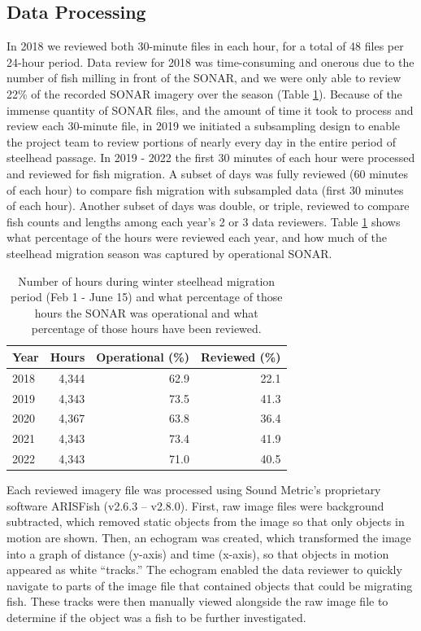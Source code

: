 \documentclass[
]{article}
\begin{document}
\FloatBarrier

\hypertarget{data-processing}{%
\subsection{Data Processing}\label{data-processing}}

In 2018 we reviewed both 30-minute files in each hour, for a total of 48 files per 24-hour period. Data review for 2018 was time-consuming and onerous due to the number of fish milling in front of the SONAR, and we were only able to review 22\% of the recorded SONAR imagery over the season (Table \ref{tab:op-rev}). Because of the immense quantity of SONAR files, and the amount of time it took to process and review each 30-minute file, in 2019 we initiated a subsampling design to enable the project team to review portions of nearly every day in the entire period of steelhead passage. In 2019 - 2022 the first 30 minutes of each hour were processed and reviewed for fish migration. A subset of days was fully reviewed (60 minutes of each hour) to compare fish migration with subsampled data (first 30 minutes of each hour). Another subset of days was double, or triple, reviewed to compare fish counts and lengths among each year's 2 or 3 data reviewers. Table \ref{tab:op-rev} shows what percentage of the hours were reviewed each year, and how much of the steelhead migration season was captured by operational SONAR.

\begin{table}[H]

\caption{\label{tab:op-rev}Number of hours during winter steelhead migration period (Feb 1 - June 15) and what percentage of those hours the SONAR was operational and what percentage of those hours have been reviewed.}
\centering
\begin{tabular}[t]{lrrr}
\toprule
Year & Hours & Operational (\%) & Reviewed (\%)\\
\midrule
2018 & 4,344 & 62.9 & 22.1\\
2019 & 4,343 & 73.5 & 41.3\\
2020 & 4,367 & 63.8 & 36.4\\
2021 & 4,343 & 73.4 & 41.9\\
2022 & 4,343 & 71.0 & 40.5\\
\bottomrule
\end{tabular}
\end{table}

Each reviewed imagery file was processed using Sound Metric's proprietary software ARISFish (v2.6.3 -- v2.8.0). First, raw image files were background subtracted, which removed static objects from the image so that only objects in motion are shown. Then, an echogram was created, which transformed the image into a graph of distance (y-axis) and time (x-axis), so that objects in motion appeared as white ``tracks.'' The echogram enabled the data reviewer to quickly navigate to parts of the image file that contained objects that could be migrating fish. These tracks were then manually viewed alongside the raw image file to determine if the object was a fish to be further investigated.
\end{document}
